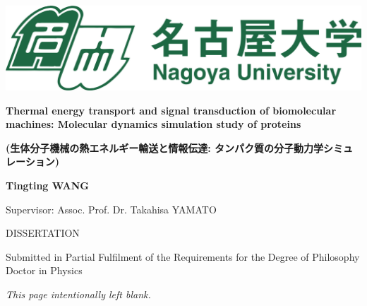 \documentclass[12pt, oneside]{article}
\begin{document}
\graphicspath{ {figures/titlepage/} }
 
\thispagestyle{empty}
\begin{center}
\begin{minipage}{1\linewidth}
    \centering
    \includegraphics[width=0.7\linewidth]{images.png}\par
    \vspace{1cm}
    {{\Large \textbf {Thermal energy transport and signal transduction of biomolecular machines: Molecular dynamics simulation study of proteins}\par}}
    \begin{CJK}{UTF8}{min}
    {{\Large \textbf {(生体分子機械の熱エネルギー輸送と情報伝達: 
    \newline タンパク質の分子動力学シミュレーション)}\par}}
    \end{CJK}
    \vspace{2cm}
    {\Large \textbf {Tingting WANG}\par}
    \vspace{1cm}
    {\Large Supervisor: Assoc. Prof. Dr. Takahisa YAMATO \par}
    \vspace{1.5cm}
    {\Large DISSERTATION \par
    Submitted in Partial Fulfilment of the Requirements 
    for the Degree of 
    Philosophy Doctor in Physics\par}
    \vspace{1.5cm}
    {\Large  \linespread{1.5}{
    Computational Biophysics Laboratory (B-Lab) \par
    Graduate School of Science \par
    September 2023 \par}}
\end{minipage}
\end{center}
\clearpage

\newpage
\begin{center}
\textit{This page intentionally left blank.}
\end{center}
\thispagestyle{empty}\newpage
\end{document}
